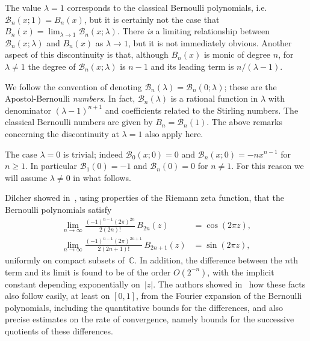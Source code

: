 \documentclass[11pt,a4paper]{amsart}
\newcommand{\C}{\mathbb{C}}
\newcommand{\B}{\mathcal{B}}
\theoremstyle{plain}
\theoremstyle{remark}
\begin{document}
The value $\lambda = 1$ corresponds to the classical Bernoulli polynomials, i.e.\ $\B_n(x;1) = B_n(x)$, but it is certainly not the case that $B_{n}(x) = \lim_{\lambda \to 1}\B_{n}(x;\lambda)$.
There \emph{is} a limiting relationship between $\B_{n}(x;\lambda)$ and $B_{n}(x)$ as $\lambda \to 1$, but it is not immediately obvious. Another aspect of this discontinuity is that, although $B_{n}(x)$ is monic of degree $n$, for $\lambda \neq 1$ the degree of $\B_{n}(x;\lambda)$ is $n-1$ and its leading term is $n/(\lambda-1)$.

We follow the convention of denoting $\B_{n}(\lambda) = \B_{n}(0;\lambda)$; these are the Apostol-Bernoulli \emph{numbers}. In fact, $\B_{n}(\lambda)$ is a rational function in $\lambda$ with denominator $(\lambda-1)^{n+1}$ and
coefficients related to the Stirling numbers. The classical Bernoulli numbers are given by $B_{n} = \B_{n}(1)$. The above remarks concerning the discontinuity at $\lambda = 1$ also apply here.

The case $\lambda = 0$ is trivial; indeed $\B_0(x;0) = 0$ and $\B_n(x;0) = -nx^{n-1}$ for $n \ge 1$. In particular 
$\B_{1}(0) = -1$ and $\B_{n}(0) = 0$ for $n \neq 1$. For this reason we will assume $\lambda \neq 0$ in what follows.

Dilcher showed in~\cite{Dil}, using properties of the Riemann zeta function, that the Bernoulli polynomials satisfy
%
\begin{equation}
\label{eq:lim-B}
\begin{aligned}
  \lim_{n \to \infty} \frac{(-1)^{n-1} (2\pi)^{2n}}{2 (2n)!} \,B_{2n}(z)
  &= \cos(2\pi z),
\\
  \lim_{n \to \infty} \frac{(-1)^{n-1} (2\pi)^{2n+1}}{2 (2n+1)!} \,B_{2n+1}(z)
  &= \sin(2\pi z),
\end{aligned}
\end{equation}
%
uniformly on compact subsets of~$\C$. In addition, the difference between the $n$th term and its limit is found to be of the order $O(2^{-n})$, with the implicit constant depending exponentially on~$|z|$.
%
The authors showed in~\cite{NRV-JAT} how these facts also follow easily, at least on $[0,1]$, from the Fourier expansion of the Bernoulli polynomials, including the quantitative bounds for the differences, and also precise estimates on the rate of convergence, namely bounds for the successive quotients of these differences.
\end{document}
